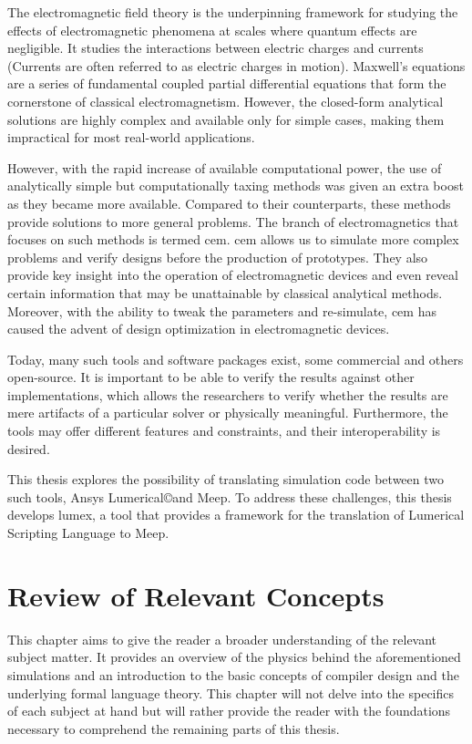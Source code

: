 The electromagnetic field theory is the underpinning framework for studying the effects of electromagnetic phenomena at scales where quantum effects are negligible. It studies the interactions between electric charges and currents (Currents are often referred to as electric charges in motion). Maxwell's equations are a series of fundamental coupled partial differential equations that form the cornerstone of classical electromagnetism. However, the closed-form analytical solutions are highly complex and available only for simple cases, making them impractical for most real-world applications.


However, with the rapid increase of available computational power, the use of analytically simple but computationally taxing methods was given an extra boost as they became more available. Compared to their counterparts, these methods provide solutions to more general problems. The branch of electromagnetics that focuses on such methods is termed \gls{cem}. \gls{cem} allows us to simulate more complex problems and verify designs before the production of prototypes. They also provide key insight into the operation of electromagnetic devices and even reveal certain information that may be unattainable by classical analytical methods. Moreover, with the ability to tweak the parameters and re-simulate, \gls{cem} has caused the advent of design optimization in electromagnetic devices.

Today, many such tools and software packages exist, some commercial and others open-source. It is important to be able to verify the results against other implementations, which allows the researchers to verify whether the results are mere artifacts of a particular solver or physically meaningful. Furthermore, the tools may offer different features and constraints, and their interoperability is desired. 

This thesis explores the possibility of translating simulation code between two such tools, Ansys Lumerical\copyright and Meep. To address these challenges, this thesis develops \gls{lumex}, a tool that provides a framework for the translation of Lumerical Scripting Language to Meep.



  
  

\chapter{Review of Relevant Concepts}
This chapter aims to give the reader a broader understanding of the relevant subject matter. It provides an overview of the physics behind the aforementioned simulations and an introduction to the basic concepts of compiler design and the underlying formal language theory. This chapter will not delve into the specifics of each subject at hand but will rather provide the reader with the foundations necessary to comprehend the remaining parts of this thesis.

